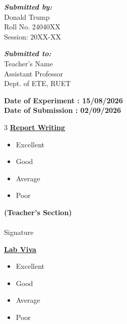 \documentclass[a4paper,12pt]{report}
\newcommand{\StudentName}{Donald Trump}
\newcommand{\StudentRoll}{Roll No. 24040XX}
\newcommand{\StudentSession}{Session: 20XX-XX}
\newcommand{\Teacher}{Teacher's Name}
\newcommand{\Designation}{Assistant Professor}
\newcommand{\TDept}{Dept. of ETE, RUET}
\begin{document}
\begin{center}
    \noindent
    \begin{minipage}[t]{0.46\linewidth}
    \begin{flushleft}
    \normalsize \emph{\textbf{Submitted by:}}\\
    \StudentName\\
    \StudentRoll\\
    \StudentSession
    \end{flushleft}
    \end{minipage}\hspace*{0.002\linewidth}
    \begin{minipage}[t]{0.46\linewidth}
    \begin{flushright}
    \normalsize \emph{\textbf{Submitted to:}}\\
    \Teacher\\
    \Designation\\
    \TDept
    \end{flushright}
    \end{minipage}
    \vspace{0.5cm}

    \textbf{Date of Experiment : 15/08/2026} \\
    \textbf{Date of Submission : 02/09/2026}
    \vspace{4cm}

    \hrulefill
    \vspace{0.2cm}

    \begin{multicols}{3}
        \textbf{\underline{Report Writing}}
        \begin{itemize}[labelindent=3em, labelsep=0.5cm, leftmargin=*, noitemsep]
            \item[$\square$] Excellent
            \item[$\square$] Good
            \item[$\square$] Average
            \item[$\square$] Poor
        \end{itemize}
        \columnbreak

        \textbf{(Teacher's Section)} \\
        \vspace{1.5cm}
        \hrulefill \\
        Signature
        \columnbreak

        \textbf{\underline{Lab Viva}}
        \begin{itemize}[labelindent=3em, labelsep=0.5cm, leftmargin=*, noitemsep]
            \item[$\square$] Excellent
            \item[$\square$] Good
            \item[$\square$] Average
            \item[$\square$] Poor
        \end{itemize}
    \end{multicols}

    \vspace{1cm}
\end{center}

\end{document}
